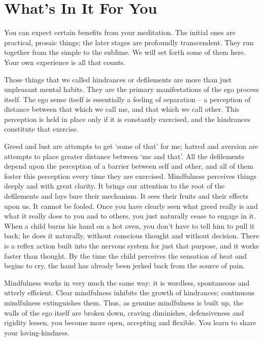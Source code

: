 \chapter{What's In It For You}

You can expect certain benefits from your meditation. The initial ones are
practical, prosaic things; the later stages are profoundly transcendent. They
run together from the simple to the sublime. We will set forth some of them
here. Your own experience is all that counts.

Those things that we called hindrances or defilements are more than just
unpleasant mental habits. They are the primary manifestations of the ego process
itself. The ego sense itself is essentially a feeling of separation -- a
perception of distance between that which we call me, and that which we call
other. This perception is held in place only if it is constantly exercised, and
the hindrances constitute that exercise.

Greed and lust are attempts to get `some of that' for me; hatred and aversion
are attempts to place greater distance between `me and that'. All the
defilements depend upon the perception of a barrier between self and other, and
all of them foster this perception every time they are exercised. Mindfulness
perceives things deeply and with great clarity. It brings our attention to the
root of the defilements and lays bare their mechanism. It sees their fruits and
their effects upon us. It cannot be fooled. Once you have clearly seen what
greed really is and what it really does to you and to others, you just naturally
cease to engage in it. When a child burns his hand on a hot oven, you don't have
to tell him to pull it back; he does it naturally, without conscious thought and
without decision. There is a reflex action built into the nervous system for
just that purpose, and it works faster than thought. By the time the child
perceives the sensation of heat and begins to cry, the hand has already been
jerked back from the source of pain.

Mindfulness works in very much the same way: it is wordless, spontaneous and
utterly efficient. Clear mindfulness inhibits the growth of hindrances;
continuous mindfulness extinguishes them. Thus, as genuine mindfulness is built
up, the walls of the ego itself are broken down, craving diminishes,
defensiveness and rigidity lessen, you become more open, accepting and flexible.
You learn to share your loving-kindness.

